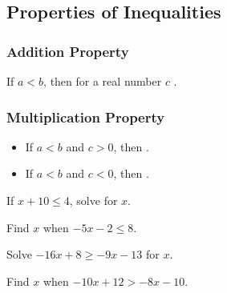 \newpage

\subsection{Properties of Inequalities}

\subsubsection*{Addition Property}
If $a<b$, then for a real number $c$ .

\subsubsection*{Multiplication Property}
\begin{itemize}
    \item If $a<b$ and $c>0$, then .
    \item If $a<b$ and $c<0$, then .
\end{itemize}

\begin{exercise}
If $x+10\leq4$, solve for $x$.
\end{exercise}
\begin{solution}[1in]

\end{solution}
\vspace{0.5em}

\begin{exercise}
Find $x$ when $-5x-2\leq8$.
\end{exercise}
\begin{solution}[2in]

\end{solution}
\vspace{0.5em}

\begin{exercise}
Solve $-16x+8\geq-9x-13$ for $x$.
\end{exercise}
\begin{solution}[2in]

\end{solution}
\vspace{0.5em}

\newpage

\begin{exercise}
Find $x$ when $-10x+12>-8x-10$.
\end{exercise}
\begin{solution}[2in]

\end{solution}
\vspace{0.5em}

